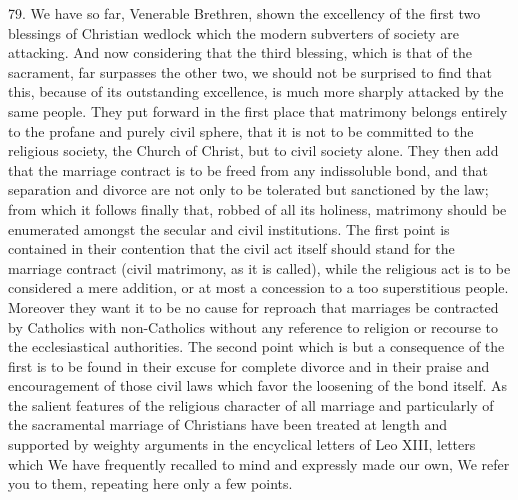 \documentclass[12pt,a4paper]{book}
\begin{document}
79. We have so far, Venerable Brethren, shown the excellency of the first two blessings of Christian wedlock which the modern subverters of society are attacking. And now considering that the third blessing, which is that of the sacrament, far surpasses the other two, we should not be surprised to find that this, because of its outstanding excellence, is much more sharply attacked by the same people. They put forward in the first place that matrimony belongs entirely to the profane and purely civil sphere, that it is not to be committed to the religious society, the Church of Christ, but to civil society alone. They then add that the marriage contract is to be freed from any indissoluble bond, and that separation and divorce are not only to be tolerated but sanctioned by the law; from which it follows finally that, robbed of all its holiness, matrimony should be enumerated amongst the secular and civil institutions. The first point is contained in their contention that the civil act itself should stand for the marriage contract (civil matrimony, as it is called), while the religious act is to be considered a mere addition, or at most a concession to a too superstitious people. Moreover they want it to be no cause for reproach that marriages be contracted by Catholics with non-Catholics without any reference to religion or recourse to the ecclesiastical authorities. The second point which is but a consequence of the first is to be found in their excuse for complete divorce and in their praise and encouragement of those civil laws which favor the loosening of the bond itself. As the salient features of the religious character of all marriage and particularly of the sacramental marriage of Christians have been treated at length and supported by weighty arguments in the encyclical letters of Leo XIII, letters which We have frequently recalled to mind and expressly made our own, We refer you to them, repeating here only a few points.
\end{document}
